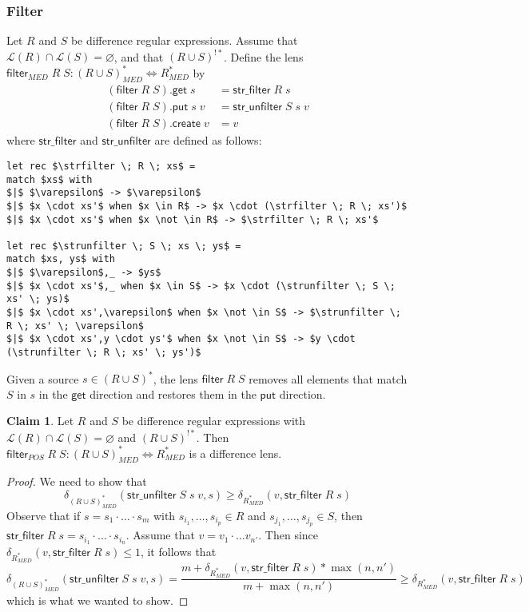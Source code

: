 \documentclass[acmsmall,review,anonymous]{acmart}\settopmatter{printfolios=true,printccs=false,printacmref=false}
\theoremstyle{definition}
\newtheorem{claim}{Claim}
\newcommand{\kw}[1]{\ensuremath{\mathsf{#1}}\xspace}
\newcommand{\get}{\ensuremath{\kw{get}}\xspace}
\newcommand{\pput}{\ensuremath{\kw{put}}\xspace}
\newcommand{\create}{\ensuremath{\kw{create}}\xspace}
\newcommand{\filter}{\ensuremath{\kw{filter}}\xspace}
\newcommand{\strfilter}{\ensuremath{\kw{str\_filter}}\xspace}
\newcommand{\strunfilter}{\ensuremath{\kw{str\_unfilter}}\xspace}
\begin{document}
\subsubsection{Filter}
Let $R$ and $S$ be difference regular expressions. Assume that $\mathcal{L}(R) \cap \mathcal{L}(S) = \varnothing$, and that $(R \cup S)^{!*}$. Define the lens $\filter_{MED} \; R \; S : (R \cup S)^*_{MED} \Leftrightarrow R^*_{MED}$ by
\begin{align*}
(\filter \; R \; S).\get \; s &= \strfilter \; R \; s\\
(\filter \; R \; S).\pput \; s \; v &= \strunfilter \; S \; s \;v\\
(\filter \; R \; S).\create \; v &= v
\end{align*}
where \strfilter and \strunfilter are defined as follows:
\begin{lstlisting}[mathescape=true]
let rec $\strfilter \; R \; xs$ = 
match $xs$ with
$|$ $\varepsilon$ -> $\varepsilon$
$|$ $x \cdot xs'$ when $x \in R$ -> $x \cdot (\strfilter \; R \; xs')$
$|$ $x \cdot xs'$ when $x \not \in R$ -> $\strfilter \; R \; xs'$

let rec $\strunfilter \; S \; xs \; ys$ = 
match $xs, ys$ with
$|$ $\varepsilon$,_ -> $ys$
$|$ $x \cdot xs'$,_ when $x \in S$ -> $x \cdot (\strunfilter \; S \; xs' \; ys)$
$|$ $x \cdot xs',\varepsilon$ when $x \not \in S$ -> $\strunfilter \; R \; xs' \; \varepsilon$
$|$ $x \cdot xs',y \cdot ys'$ when $x \not \in S$ -> $y \cdot (\strunfilter \; R \; xs' \; ys')$
\end{lstlisting}
Given a source $s \in (R \cup S)^*$, the lens $\filter \; R \; S$ removes all elements that match $S$ in $s$ in the \get direction and restores them in the \pput direction.
\begin{claim}
Let $R$ and $S$ be difference regular expressions with $\mathcal{L}(R) \cap \mathcal{L}(S) = \varnothing$ and $(R \cup S)^{!*}$. Then $\filter_{POS} \; R \; S : (R \cup S)^*_{MED} \Leftrightarrow R^*_{MED}$ is a difference lens.
\end{claim}
\begin{proof}
We need to show that
$$
\delta_{(R \cup S)^*_{MED}} (\strunfilter \; S \; s \; v, s) \geq \delta_{R^*_{MED}}(v, \strfilter \; R \; s)$$
Observe that if $s = s_1 \cdot \ldots \cdot s_m$ with $s_{i_1}, \ldots, s_{i_p} \in R$ and $s_{j_1}, \ldots, s_{j_p} \in S$, then $\strfilter \; R \; s = s_{i_1} \cdot \ldots \cdot s_{i_n}$. Assume that $v = v_1 \cdot \ldots v_{n'}$. Then since $\delta_{R^*_{MED}}(v, \strfilter \; R \; s) \leq 1$, it follows that
$$
\delta_{(R \cup S)^*_{MED}} (\strunfilter \; S \; s \; v, s) = \frac{m + \delta_{R^*_{MED}}(v, \strfilter \; R \; s) * \max(n,n')}{m+\max(n,n')} \geq \delta_{R^*_{MED}}(v, \strfilter \; R \; s)
$$
which is what we wanted to show.
\end{proof}
\end{document}
